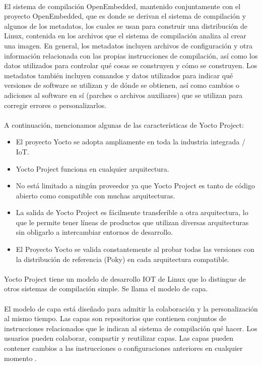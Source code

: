 \paragraph{}
El sistema de compilación OpenEmbedded, mantenido conjuntamente con el proyecto OpenEmbedded, que es donde se derivan el sistema de compilación y algunos de los metadatos, los cuales se usan para construir una distribución de Linux, contenida en los archivos que el sistema de compilación analiza al crear una imagen. En general, los metadatos incluyen archivos de configuración y otra información relacionada con las propias instrucciones de compilación, así como los datos utilizados para controlar qué cosas se construyen y cómo se construyen. Los metadatos también incluyen comandos y datos utilizados para indicar qué versiones de software se utilizan y de dónde se obtienen, así como cambios o adiciones al software en sí (parches o archivos auxiliares) que se utilizan para corregir errores o personalizarlos.
\paragraph{}
A continuación, mencionamos algunas de las características de Yocto Project:
\begin{itemize}
	\item El proyecto Yocto se adopta ampliamente en toda la industria integrada / IoT.
    \item Yocto Project funciona en cualquier arquitectura.
    \item No está limitado a ningún proveedor ya que Yocto Project es tanto de código abierto como compatible con muchas arquitecturas.
    \item La salida de Yocto Project es fácilmente transferible a otra arquitectura, lo que le permite tener líneas de productos que utilizan diversas arquitecturas sin obligarlo a intercambiar entornos de desarrollo.
    \item El Proyecto Yocto se valida constantemente al probar todas las versiones con la distribución de referencia (Poky) en cada arquitectura compatible.
\end{itemize}
\paragraph{}
Yocto Project tiene un modelo de desarrollo IOT de Linux que lo distingue de otros sistemas de compilación simple. Se llama el modelo de capa.
\paragraph{}
El modelo de capa está diseñado para admitir la colaboración y la personalización al mismo tiempo. Las capas son repositorios que contienen conjuntos de instrucciones relacionados que le indican al sistema de compilación qué hacer. Los usuarios pueden colaborar, compartir y reutilizar capas. Las capas pueden contener cambios a las instrucciones o configuraciones anteriores en cualquier momento \citep{MarcoTeoricoYocto2}.


